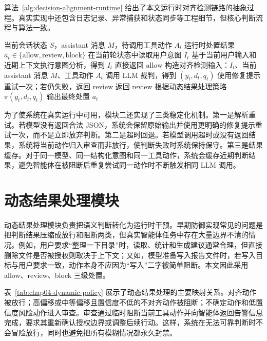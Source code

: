 算法~\ref{alg:decision-alignment-runtime} 给出了本文运行时对齐检测链路的抽象过程。真实实现中还包含日志记录、异常捕获和状态同步等工程细节，但核心判断流程与算法一致。

\begin{algorithm}[htbp]
  \caption{工具调用前的意图决策对齐检测流程}
  \label{alg:decision-alignment-runtime}
  \begin{algorithmic}[1]
    \REQUIRE 当前会话状态 \(S\)，assistant 消息 \(M\)，待调用工具动作 \(A_t\)
    \ENSURE 运行时处置结果 \(a_t \in \{\text{allow}, \text{review}, \text{block}\}\)
    \STATE 在当前轮状态中读取用户意图 \(I_t\)
      \STATE 基于当前用户输入和近期上下文执行意图分析，得到 \(I_t\)
    \ENDIF
      \STATE 直接返回 \(\text{allow}\)
    \ENDIF
    \STATE 构造对齐检测输入：\(I_t\)、当前 assistant 消息 \(M\)、工具动作 \(A_t\)
    \STATE 调用 LLM 裁判，得到 \((y_t, d_t, q_t)\)
      \STATE 使用修复提示重试一次；若仍失败，返回 \(\text{review}\)
    \ENDIF
      \STATE 返回 \(\text{review}\)
    \ENDIF
    \STATE 根据动态结果处理策略 \(\pi(y_t,d_t,q_t)\) 输出最终处置 \(a_t\)
  \end{algorithmic}
\end{algorithm}

为了使系统在真实运行中可用，模块二还实现了三类稳定化机制。第一是解析重试。若模型没有返回合法 JSON，系统会保留原始输出并使用更明确的修复提示重试一次，而不是立即放弃判断。第二是超时回退。若模型调用超时或没有返回结果，系统将当前动作归入审查而非放行，使判断失败时系统保持保守。第三是结果缓存。对于同一模型、同一结构化意图和同一工具动作，系统会缓存近期判断结果，避免智能体在被阻断后重复尝试同一动作时不断触发相同 LLM 调用。

\section{动态结果处理模块}

动态结果处理模块负责把语义判断转化为运行时干预。早期防御实现常见的问题是把判断结果压缩成放行和阻断两类，但真实智能体任务中存在大量边界不清的情况。例如，用户要求“整理一下目录”时，读取、统计和生成建议通常合理，但直接删除文件是否被授权则取决于上下文；又如，模型准备写入报告文件时，若写入目标与用户要求一致，动作本身不应因为“写入”二字被简单阻断。本文因此采用 allow、review、block 三级处置。

表~\ref{tab:chap04-dynamic-policy} 展示了动态结果处理的主要映射关系。对齐动作被放行；高偏移或中等偏移且置信度不低的不对齐动作被阻断；不确定动作和低置信度风险动作进入审查。审查通过临时阻断当前工具动作并向智能体返回告警信息完成，要求其重新确认授权边界或调整后续行动。这样，系统在无法可靠判断时不会冒险放行，同时也避免把所有模糊情况都永久封禁。

